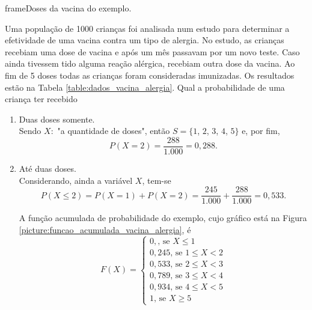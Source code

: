 \begin{pageWidthArea}
	\begin{pageWidthAreaPicture}{frame}{Doses da vacina do exemplo.}
		\label{table:dados_vacina_alergia}
		\hspace{-15pt}
	\end{pageWidthAreaPicture}

	\vspace{10pt}

	\begin{example}
		Uma população de 1000 crianças foi analisada num estudo para determinar a efetividade de uma vacina contra um tipo de alergia. No estudo, as crianças recebiam uma dose de vacina e após um mês passavam por um novo teste. Caso ainda tivessem tido alguma reação alérgica, recebiam outra dose da vacina. Ao fim de 5 doses todas as crianças foram consideradas imunizadas. Os resultados estão na Tabela \ref{table:dados_vacina_alergia}. Qual a probabilidade de uma criança ter recebido
		\begin{enumerate}[label=\alph*]
			\item Duas doses somente.\hfill\\
			
				Sendo $X:$ "a quantidade de doses", então $S=\{1$, $2$, $3$, $4$, $5\}$ e, por fim,
				\[
					P(X=2)=\frac{288}{1.000}=0,288\text{.}
				\]

			\item Até duas doses.\hfill\\
			
				Considerando, ainda a variável $X$, tem-se
				\[
					P(X\leqslant 2)=P(X=1)+P(X=2)=\frac{245}{1.000} + \frac{288}{1.000}=0,533\text{.}
				\]

			A função acumulada de probabilidade do exemplo, cujo gráfico está na Figura \ref{picture:funcao_acumulada_vacina_alergia}, é
			\[
				F(X)= \begin{cases}
					0, \text{, se } X\leqslant 1\\
					0,245 \text{, se } 1\leqslant X < 2\\
					0,533 \text{, se } 2\leqslant X < 3\\
					0,789 \text{, se } 3 \leqslant X < 4\\
					0,934 \text{, se } 4 \leqslant X < 5\\
					1 \text{, se } X \geqslant 5
				\end{cases}
			\]
		\end{enumerate}
	\end{example}
	

\end{pageWidthArea}
